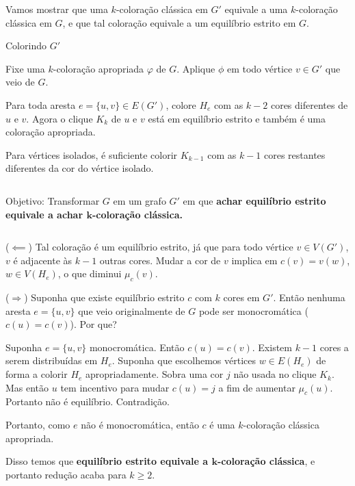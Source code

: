 \documentclass{beamer}
\theoremstyle{plain}
\begin{document}
\begin{frame}
  Vamos mostrar que uma $k$-coloração clássica em $G'$ equivale a uma $k$-coloração clássica em
  $G$, e que tal coloração equivale a um equilíbrio estrito em $G$.

  {\color{blue} Colorindo $G'$}

  Fixe uma $k$-coloração apropriada $\varphi$ de $G$. Aplique $\phi$ em todo vértice $v\in G'$ que
  veio de $G$.

  Para toda aresta $e=\{u,v\}\in E(G')$, colore $H_e$ com as $k-2$ cores diferentes de $u$ e $v$.
  Agora o clique $K_k$ de $u$ e $v$ está em equilíbrio estrito e também é uma coloração apropriada.

  Para vértices isolados, é suficiente colorir $K_{k-1}$ com as $k-1$ cores restantes diferentes da
  cor do vértice isolado.
\end{frame}

\begin{frame}
  \begin{columns}[t]
    \begin{column}{0.9\textwidth}
      \begin{block}{Objetivo:}
        Transformar $G$ em um grafo $G'$ em que \textbf{achar equilíbrio estrito equivale a achar
        $\mathbf{k}$-coloração clássica.}
      \end{block}
    \end{column}
  \end{columns}
  \vspace{0.2in}

  ($\impliedby$) Tal coloração é um equilíbrio estrito, já que para todo vértice $v\in V(G')$, $v$
  é adjacente às $k-1$ outras cores. Mudar a cor de $v$ implica em $c(v)=v(w)$, $w\in V(H_e)$, o
  que diminui $\mu_c(v)$.

  (\;$\Longrightarrow$\;) Suponha que existe equilíbrio estrito $c$ com $k$ cores em $G'$. Então
  nenhuma aresta $e=\{u,v\}$ que veio originalmente de $G$ pode ser monocromática ($c(u)=c(v)$).
  Por que?
\end{frame}

\begin{frame}
  Suponha $e=\{u,v\}$ monocromática. Então $c(u)=c(v)$. Existem $k-1$ cores a serem distribuídas em
  $H_e$. Suponha que escolhemos vértices $w\in E(H_e)$ de forma a colorir $H_e$ apropriadamente.
  Sobra uma cor $j$ não usada no clique $K_k$. Mas então $u$ tem incentivo para mudar $c(u)=j$ a
  fim de aumentar $\mu_c(u)$. Portanto não é equilíbrio. Contradição.

  Portanto, como $e$ não é monocromática, então $c$ é uma $k$-coloração clássica apropriada.

  Disso temos que \textbf{equilíbrio estrito equivale a $\mathbf{k}$-coloração clássica}, e
  portanto redução acaba para $k\geq 2$.
\end{frame}
\end{document}
